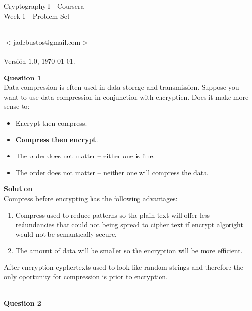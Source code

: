 \documentclass[a4paper,12pt]{article}
\author{Jos\'e Angel de Bustos P\'erez}
\begin{document}
\thispagestyle{empty}

\begin{center}
\Huge{Cryptography I - Coursera} \\[.75cm]
\large{Week 1 - Problem Set}
\end{center}

\large 
\begin{flushright}
\yo \\
$<$jadebustos@gmail.com$>$\\ \ \\ 
Versi\'on $1.0$, \today .\\
\textbf{\LaTeXe}
\end{flushright}

\normalsize

\textbf{Question 1} \\

Data compression is often used in data storage and transmission. Suppose you want to use data compression in conjunction with encryption. Does it make more sense to:
%
\begin{itemize}
\item Encrypt then compress.
\item \textbf{Compress then encrypt}.
\item The order does not matter -- either one is fine.
\item The order does not matter -- neither one will compress the data.
\end{itemize}

\textbf{Solution}\\

Compress before encrypting has the following advantages:
%
\begin{enumerate}
\item Compress used to reduce patterns so the plain text will offer less redundancies that could not being spread to cipher text if encrypt algoright would not be semantically secure.
\item The amount of data will be smaller so the encryption will be more efficient.
\end{enumerate}
%
After encryption cyphertexts used to look like random strings and therefore the only oportunity for compression is prior to encryption.\\

\ \newpage

\textbf{Question 2} \\
\end{document}

